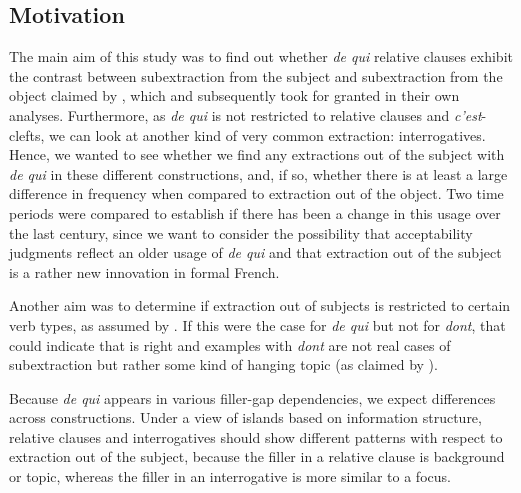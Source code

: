 \subsection{Motivation}
The main aim of this study was to find out whether \emph{de qui} relative clauses exhibit the contrast between subextraction from the subject and subextraction from the object claimed by \citet{Tellier.1990,Tellier.1991}, which \citet{Stepanov.2007} and \citet{Heck.2009} subsequently took for granted in their own analyses. Furthermore, as \emph{de qui} is not restricted to relative clauses and \emph{c'est}-clefts, we can look at another kind of very common extraction: interrogatives. Hence, we wanted to see whether we find any extractions out of the subject with \emph{de qui} in these different constructions, and, if so, whether there is at least a large difference in frequency when compared to extraction out of the object. Two time periods were compared to establish if there has been a change in this usage over the last century, since we want to consider the possibility that  acceptability judgments reflect an older usage of \emph{de qui} and that extraction out of the subject is a rather new innovation in formal French. 

Another aim was to determine if extraction out of subjects is restricted to certain verb types, as assumed by \citet{Chomsky.2008}. If this were the case for \emph{de qui} but not for \emph{dont}, that could indicate that \citeauthor{Chomsky.2008} is right and examples with \emph{dont} are not real cases of subextraction but rather some kind of hanging topic (as claimed by \citealt{Uriagereka.2012}).

Because \emph{de qui} appears in various filler-gap dependencies, we expect differences across constructions. Under a view of islands based on information structure, relative clauses and interrogatives should show different patterns with respect to extraction out of the subject, because the filler in a relative clause is background or topic, whereas the filler in an interrogative is more similar to a focus.